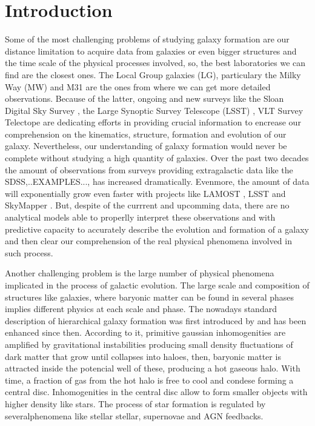 \documentclass[usenatbib]{mn2e}
\begin{document}




\section{Introduction}
\label{sec:introduction}


Some of the most challenging problems of studying galaxy formation are
our distance limitation to acquire data from galaxies or even bigger
structures and the time scale of the physical processes involved, so,
the best laboratories we can find are the closest ones. The Local
Group galaxies (LG), particulary the Milky Way (MW) and M31 are the
ones from where we can get more detailed observations. Because of the
latter, ongoing and new surveys like the Sloan Digital Sky Survey
\citep{2009ApJS..182..543A}, the Large Synoptic Survey Telescope
(LSST) \citep{2009arXiv0912.0201L}, VLT Survey Telectope
\citep{2011Msngr.146....2C} are dedicating efforts in providing
crucial information to encrease our comprehension on the kinematics,
structure, formation and evolution of our galaxy. Nevertheless, our
understanding of galaxy formation would never be complete without
studying a high quantity of galaxies. Over the past two decades the
amount of observations from surveys providing extragalactic data like
the SDSS,..EXAMPLES..., has increased dramatically. Evenmore, the
amount of data will exponentially grow even faster with projects like
LAMOST \citep{2009AAS...21341614N}, LSST and SkyMapper
\citep{2007PASA...24....1K}. But, despite of the currrent and
upcomming  data, there are no analytical models able to properlly
interpret these observations and with  predictive capacity  to
accurately describe the evolution and formation of a galaxy and then
clear our comprehension of the real physical phenomena involved in
such process. 


Another challenging problem is the large number of physical phenomena
implicated in the process of galactic evolution. The large  scale and
composition of structures like galaxies, where baryonic matter can be
found in several phases implies  different physics at each scale and
phase. The nowadays standard description of hierarchical galaxy
formation was first introduced by \cite{1978MNRAS.183..341W} and has
been enhanced since then. According to it, primitive gaussian
inhomogenities are amplified by gravitational instabilities producing
small density fluctuations of dark matter that  grow until  collapses
into  haloes, then, baryonic matter is attracted inside the potencial
well of these, producing a hot gaseous halo. With time, a fraction of
gas from the hot halo is free to cool  and condese forming a central
disc. Inhomogenities in the central disc allow to form smaller objects
with higher density like stars. The process of star formation is
regulated by severalphenomena like stellar stellar, supernovae and AGN
feedbacks.   
\end{document}
